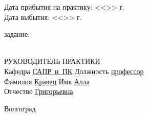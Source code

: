 \documentclass[a4paper, 14pt]{extreport}
\begin{document}
\begin{titlepage}
\begin{flushleft}
            Дата прибытия на практику: <<\underline{\hspace{1cm}}>> \underline{\hspace{3cm}} 
            \the\year г.\\
            Дата выбытия: \hspace{3cm}<<\underline{\hspace{1cm}}>> \underline{\hspace{3cm}} 
            \the\year г.
        \end{flushleft}
        \vspace{1cm}
         задание: \underline{\hspace{11.25cm}}\\
        \underline{\hspace{\textwidth}}\\
        \vspace{1cm}
        \begin{flushleft}
            РУКОВОДИТЕЛЬ ПРАКТИКИ\\
            Кафедра \underline{САПР~и~ПК\hspace{2.4cm}} Должность \underline{профессор\hspace{2.8cm}} \\
            Фамилия \underline{Кравец\hspace{3.3cm}} Имя \underline{Алла\hspace{5.5cm}}\\
            Отчество \underline{Григорьевна\hspace{2.2cm}}
        \end{flushleft}
        \vspace{\fill}
        \begin{center}
            Волгоград \the\year
        \end{center}
    \end{titlepage}
\end{document}

